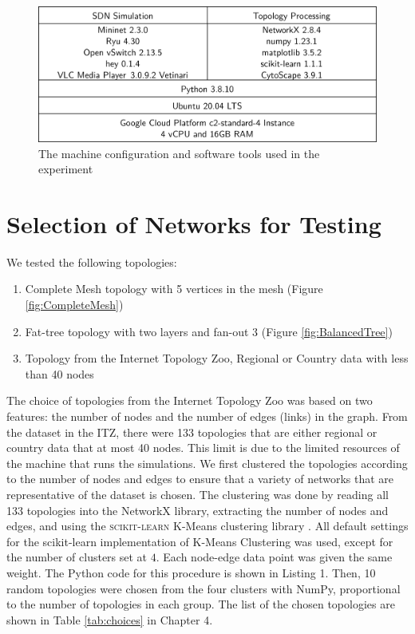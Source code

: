 \begin{figure}[htbp]
    \centering
    \includegraphics[width=\textwidth]{Figures/Test Machine Configuration.drawio.png}
    \caption{The machine configuration and software tools used in the experiment}
    \label{fig:tools}
\end{figure}

\section{Selection of Networks for Testing} \label{sec:selection}
We tested the following topologies:
\begin{enumerate}
    \item Complete Mesh topology with 5 vertices in the mesh (Figure \ref{fig:CompleteMesh})
    \item Fat-tree topology with two layers and fan-out 3 (Figure \ref{fig:BalancedTree})
    \item Topology from the Internet Topology Zoo, Regional or Country data with less than 40 nodes
\end{enumerate}

The choice of topologies from the Internet Topology Zoo was based on two features: the number of nodes and the number of edges (links) in the graph. From the dataset in the ITZ, there were 133 topologies that are either regional or country data that at most 40 nodes. This limit is due to the limited resources of the machine that runs the simulations. We first clustered the topologies according to the number of nodes and edges to ensure that a variety of networks that are representative of the dataset is chosen. The clustering was done by reading all 133 topologies into the NetworkX library, extracting the number of nodes and edges, and using the \textsc{scikit-learn} K-Means clustering library \cite{pedregosa_scikit-learn_2011}. All default settings for the scikit-learn implementation of K-Means Clustering was used, except for the number of clusters set at $4$. Each node-edge data point was given the same weight. The Python code for this procedure is shown in Listing 1. Then, 10 random topologies were chosen from the four clusters with NumPy, proportional to the number of topologies in each group. The list of the chosen topologies are shown in Table \ref{tab:choices} in Chapter 4.

